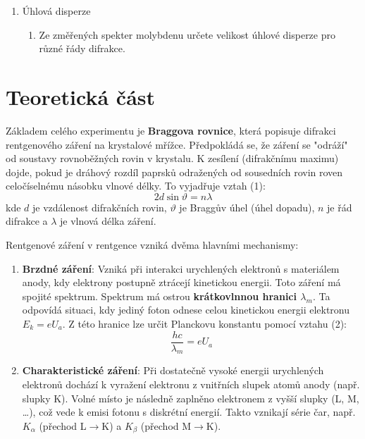 \begin{enumerate}
\begin{enumerate}
\begin{enumerate}
        \item Přesvědčte se, že i naměřené polohy absorpčních hran Zr a Ni splňují Moseleyův zákon.

        \item Všimněte si, že absorpční hrana Ni koinciduje se spektrální čarou K$\beta$ mědi; této skutečnosti se využívá v rentgenové difraktografii pro monochromatizaci charakteristického spektra mědi. Z provedeného měření určete filtrační efekt niklu pro čáru K$\beta$.
    \end{enumerate}

\item Úhlová disperze

    \begin{enumerate}
        \item Ze změřených spekter molybdenu určete velikost úhlové disperze pro různé řády difrakce.
    \end{enumerate}
\end{enumerate}

\end{enumerate}

\section{Teoretická část}

Základem celého experimentu je \textbf{Braggova rovnice}, která popisuje difrakci rentgenového záření na krystalové mřížce. Předpokládá se, že záření se "odráží" od soustavy rovnoběžných rovin v krystalu. K zesílení (difrakčnímu maximu) dojde, pokud je dráhový rozdíl paprsků odražených od sousedních rovin roven celočíselnému násobku vlnové délky. To vyjadřuje vztah (1):
%
$$ 2d \sin \vartheta = n\lambda $$
%
kde $d$ je vzdálenost difrakčních rovin, $\vartheta$ je Braggův úhel (úhel dopadu), $n$ je řád difrakce a $\lambda$ je vlnová délka záření.

Rentgenové záření v rentgence vzniká dvěma hlavními mechanismy:

\begin{enumerate}
    \item \textbf{Brzdné záření}: Vzniká při interakci urychlených elektronů s materiálem anody, kdy elektrony postupně ztrácejí kinetickou energii. Toto záření má spojité spektrum. Spektrum má ostrou \textbf{krátkovlnnou hranici $\lambda_m$}. Ta odpovídá situaci, kdy jediný foton odnese celou kinetickou energii elektronu $E_k = eU_a$. Z této hranice lze určit Planckovu konstantu pomocí vztahu (2):
    $$ \frac{hc}{\lambda_m} = eU_a $$
    \item \textbf{Charakteristické záření}: Při dostatečně vysoké energii urychlených elektronů dochází k vyražení elektronu z vnitřních slupek atomů anody (např. slupky K). Volné místo je následně zaplněno elektronem z vyšší slupky (L, M, \dots), což vede k emisi fotonu s diskrétní energií. Takto vznikají série čar, např. $K_{\alpha}$ (přechod L$\to$K) a $K_{\beta}$ (přechod M$\to$K).
\end{enumerate}

